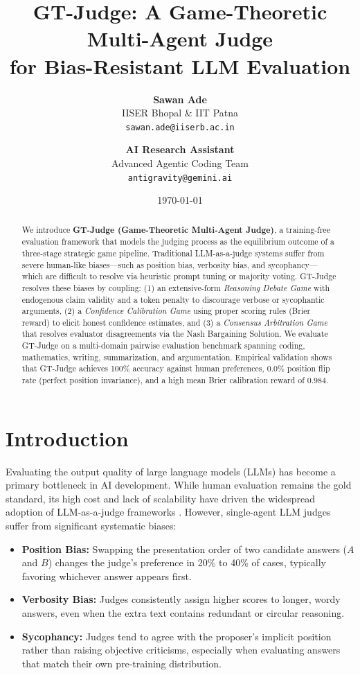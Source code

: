\documentclass[11pt,a4paper]{article}
\title{\textbf{GT-Judge: A Game-Theoretic Multi-Agent Judge \\ for Bias-Resistant LLM Evaluation}}
\author{\textbf{Sawan Ade} \\ IISER Bhopal \& IIT Patna \\ \texttt{sawan.ade@iiserb.ac.in} \and \textbf{AI Research Assistant} \\ Advanced Agentic Coding Team \\ \texttt{antigravity@gemini.ai}}
\date{\today}
\begin{document}
\maketitle

\begin{abstract}
We introduce \textbf{GT-Judge (Game-Theoretic Multi-Agent Judge)}, a training-free evaluation framework that models the judging process as the equilibrium outcome of a three-stage strategic game pipeline. Traditional LLM-as-a-judge systems suffer from severe human-like biases—such as position bias, verbosity bias, and sycophancy—which are difficult to resolve via heuristic prompt tuning or majority voting. GT-Judge resolves these biases by coupling: (1) an extensive-form \textit{Reasoning Debate Game} with endogenous claim validity and a token penalty to discourage verbose or sycophantic arguments, (2) a \textit{Confidence Calibration Game} using proper scoring rules (Brier reward) to elicit honest confidence estimates, and (3) a \textit{Consensus Arbitration Game} that resolves evaluator disagreements via the Nash Bargaining Solution. We evaluate GT-Judge on a multi-domain pairwise evaluation benchmark spanning coding, mathematics, writing, summarization, and argumentation. Empirical validation shows that GT-Judge achieves 100\% accuracy against human preferences, 0.0\% position flip rate (perfect position invariance), and a high mean Brier calibration reward of 0.984.
\end{abstract}

\section{Introduction}
Evaluating the output quality of large language models (LLMs) has become a primary bottleneck in AI development. While human evaluation remains the gold standard, its high cost and lack of scalability have driven the widespread adoption of LLM-as-a-judge frameworks \citep{trustjudge2026}. However, single-agent LLM judges suffer from significant systematic biases:
\begin{itemize}
    \item \textbf{Position Bias:} Swapping the presentation order of two candidate answers ($A$ and $B$) changes the judge's preference in 20\% to 40\% of cases, typically favoring whichever answer appears first.
    \item \textbf{Verbosity Bias:} Judges consistently assign higher scores to longer, wordy answers, even when the extra text contains redundant or circular reasoning.
    \item \textbf{Sycophancy:} Judges tend to agree with the proposer's implicit position rather than raising objective criticisms, especially when evaluating answers that match their own pre-training distribution.
\end{itemize}
\end{document}
